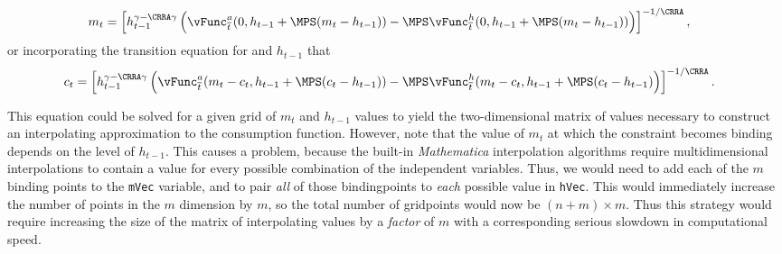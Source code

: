 \documentclass[titlepage, headings=optiontotocandhead]{\econtex}
\newcommand{\Mma}{\textit{Mathematica}}
\begin{document}
{  \begin{equation}\begin{gathered}\begin{aligned}
        {m}_{t}  & = \left[h_{t-1}^{\gamma-\CRRA\gamma} \left(\vEOPt^{{a}}(0,h_{t-1}+\MPS({m}_{t}-h_{t-1}))-\MPS \vEOPt^{h}(0,h_{t-1}+\MPS({m}_{t}-h_{t-1}))\right)  \right]^{-1/\CRRA}, \label{eq:LCbindsHabits}
      \end{aligned}\end{gathered}\end{equation}
  or incorporating the transition equation for
  and $h_{t-1}$ that
  \begin{equation}\begin{gathered}\begin{aligned}
        {c}_{t}  & = \left[h_{t-1}^{\gamma-\CRRA\gamma}
          \left(\vEOPt^{{a}}({m}_{t}-{c}_{t},h_{t-1}+\MPS({c}_{t}-h_{t-1}))
            -\MPS \vEOPt^{h}({m}_{t}-{c}_{t},h_{t-1}+\MPS({c}_{t}-h_{t-1})\right)
        \right]^{-1/\CRRA}. \nonumber
      \end{aligned}\end{gathered}\end{equation}

  This equation could be solved for a given grid of ${m}_{t}$ and
  $h_{t-1}$ values to yield the two-dimensional matrix of values
  necessary to construct an interpolating approximation to the
  consumption function.  However, note that the value of ${m}_{t}$ at
  which the constraint becomes binding depends on the level of
  $h_{t-1}$.  This causes a problem, because the built-in {\Mma}
  interpolation algorithms require multidimensional interpolations to
  contain a value for every possible combination of the independent
  variables.  Thus, we would need to add each of the $m$ binding
  points to the \texttt{mVec} variable, and to pair \textit{all} of
  those bindingpoints to \textit{each} possible value in \texttt{hVec}.
  This would immediately increase the number of points in the ${m}$
  dimension by $m$, so the total number of gridpoints would now be
  $(n+m) \times m$.  Thus this strategy would require increasing the
  size of the matrix of interpolating values by a \textit{factor} of $m$
  with a corresponding serious slowdown in computational speed.

}
\end{document}
